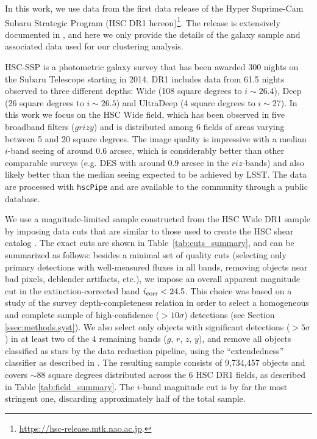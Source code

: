 \documentclass[a4paper,11pt]{article}
\begin{document}
  In this work, we use data from the first data release of the Hyper Suprime-Cam Subaru Strategic Program (HSC DR1 hereon)\footnote{\url{https://hsc-release.mtk.nao.ac.jp}.}. The release is extensively documented in \cite{2018PASJ...70S...8A}, and here we only provide the details of the galaxy sample and associated data used for our clustering analysis.

  HSC-SSP is a photometric galaxy survey that has been awarded 300 nights on the Subaru Telescope starting in 2014. DR1 includes data from 61.5 nights observed to three different depths: Wide (108 square degrees to $i\sim 26.4$), Deep (26 square degrees to $i\sim26.5$) and UltraDeep (4 square degrees to $i\sim 27$). In this work we focus on the HSC Wide field, which has been observed in five broadband filters ($grizy$) and is distributed among 6 fields  of areas varying between 5 and 20 square degrees. The image quality is impressive with a median $i$-band seeing of around 0.6 arcsec, which is considerably better than other comparable surveys (e.g. DES with around 0.9 arcsec in the $riz$-bands) and also likely better than the median seeing expected to be achieved by LSST. The data are processed with \texttt{hscPipe} \cite{2018PASJ...70S...5B} and are available to the community through a public database.
  
  We use a magnitude-limited sample constructed from the HSC Wide DR1 sample by imposing data cuts that are similar to those used to create the HSC shear catalog \cite{2018PASJ...70S..25M}. The exact cuts are shown in Table~\ref{tab:cuts_summary}, and can be summarized as follows: besides a minimal set of quality cuts (selecting only primary detections with well-measured fluxes in all bands, removing objects near bad pixels, deblender artifacts, etc.), we impose an overall apparent magnitude cut in the extinction-corrected band $i_{\rm corr}<24.5$. This choice was based on a study of the survey depth-completeness relation in order to select a homogeneous and complete sample of high-confidence ($>10\sigma$) detections (see Section \ref{ssec:methods.syst}). We also select only objects with significant detections ($>5\sigma$) in at least two of the 4 remaining bands ($g,\,r,\,z,\,y$), and remove all objects classified as stars by the data reduction pipeline, using the ``extendedness'' classifier as described in \cite{2018PASJ...70S..25M,2018PASJ...70S...5B}. The resulting sample consists of 9,734,457 objects and covers $\sim88$ square degrees distributed across the 6 HSC DR1 fields, as described in Table \ref{tab:field_summary}. The $i$-band magnitude cut is by far the most stringent one, discarding approximately half of the total sample.
\end{document}
